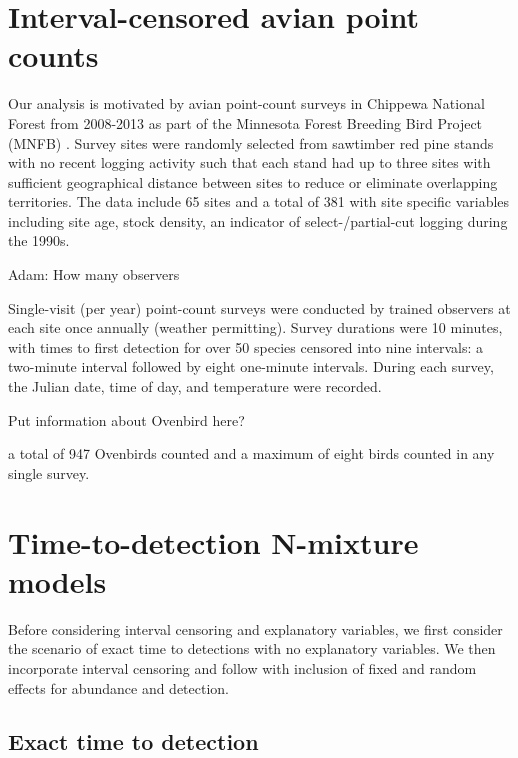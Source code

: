\documentclass[useAMS,usenatbib,referee,12pt]{article}
\newcommand{\jarad}[1]{{\color{Orange} #1}}
\begin{document}
\section{Interval-censored avian point counts}\label{sec:data}

Our analysis is motivated by avian point-count surveys in Chippewa National Forest from 2008-2013 as part of the Minnesota Forest Breeding Bird Project (MNFB) \citet{Hanowski1995}.  
Survey sites were randomly selected from sawtimber red pine stands with no recent logging activity such that each stand had up to three sites with sufficient geographical distance between sites to reduce or eliminate overlapping territories.
The data include 65 sites and a total of 381 with site specific variables including site age,  stock density, an indicator of select-/partial-cut logging during the 1990s. 





\jarad{Adam: How many observers}

Single-visit (per year) point-count surveys were conducted by trained observers at each site once annually (weather permitting).  
Survey durations were 10 minutes, with times to first detection for over 50 species censored into nine intervals: a two-minute interval followed by eight one-minute intervals.  
During each survey, the Julian date, time of day, and temperature were recorded. 

\jarad{Put information about Ovenbird here?}

a total of 947 Ovenbirds counted and a maximum of eight birds counted in any single survey.






\section{Time-to-detection N-mixture models}

Before considering interval censoring and explanatory variables, we first consider the scenario of exact time to detections with no explanatory variables. 
We then incorporate interval censoring and follow with inclusion of fixed and random effects for abundance and detection. 

\subsection{Exact time to detection}
\end{document}
